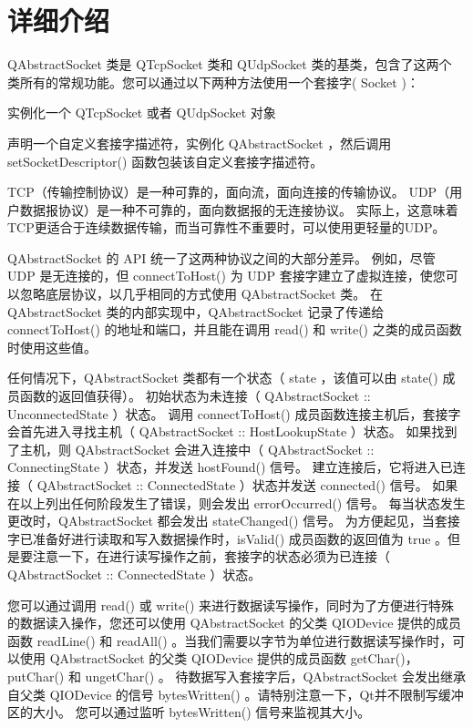 \section{详细介绍}

QAbstractSocket 类是 QTcpSocket 类和 QUdpSocket 类的基类，包含了这两个
类所有的常规功能。您可以通过以下两种方法使用一个套接字( Socket )：

\begin{compactitem}
\item 实例化一个 QTcpSocket 或者 QUdpSocket 对象
\item 声明一个自定义套接字描述符，实例化 QAbstractSocket ，然后调用 setSocketDescriptor() 函数包装该自定义套接字描述符。
\end{compactitem}

TCP（传输控制协议）是一种可靠的，面向流，面向连接的传输协议。 UDP（用户数据报协议）是一种不可靠的，面向数据报的无连接协议。 实际上，这意味着TCP更适合于连续数据传输，而当可靠性不重要时，可以使用更轻量的UDP。

QAbstractSocket 的 API 统一了这两种协议之间的大部分差异。 例如，尽管 UDP 是无连接的，但 connectToHost() 为 UDP 套接字建立了虚拟连接，使您可以忽略底层协议，以几乎相同的方式使用 QAbstractSocket 类。 在 QAbstractSocket 类的内部实现中，QAbstractSocket 记录了传递给 connectToHost() 的地址和端口，并且能在调用 read() 和 write() 之类的成员函数时使用这些值。

任何情况下，QAbstractSocket 类都有一个状态（ state ，该值可以由 state() 成员函数的返回值获得）。 初始状态为未连接（ QAbstractSocket :: UnconnectedState ）状态。 调用 connectToHost() 成员函数连接主机后，套接字会首先进入寻找主机（ QAbstractSocket :: HostLookupState ）状态。 如果找到了主机，则 QAbstractSocket 会进入连接中（ QAbstractSocket :: ConnectingState ）状态，并发送 hostFound() 信号。 建立连接后，它将进入已连接（ QAbstractSocket :: ConnectedState ）状态并发送 connected() 信号。 如果在以上列出任何阶段发生了错误，则会发出 errorOccurred() 信号。 每当状态发生更改时，QAbstractSocket 都会发出 stateChanged() 信号。 为方便起见，当套接字已准备好进行读取和写入数据操作时，isValid() 成员函数的返回值为 true 。但是要注意一下，在进行读写操作之前，套接字的状态必须为已连接（ QAbstractSocket :: ConnectedState ）状态。

您可以通过调用 read() 或 write() 来进行数据读写操作，同时为了方便进行特殊的数据读入操作，您还可以使用 QAbstractSocket 的父类 QIODevice 提供的成员函数 readLine() 和 readAll() 。当我们需要以字节为单位进行数据读写操作时，可以使用 QAbstractSocket 的父类 QIODevice 提供的成员函数 getChar()，putChar() 和 ungetChar() 。 待数据写入套接字后，QAbstractSocket 会发出继承自父类 QIODevice 的信号 bytesWritten() 。请特别注意一下，Qt并不限制写缓冲区的大小。 您可以通过监听 bytesWritten() 信号来监视其大小。

